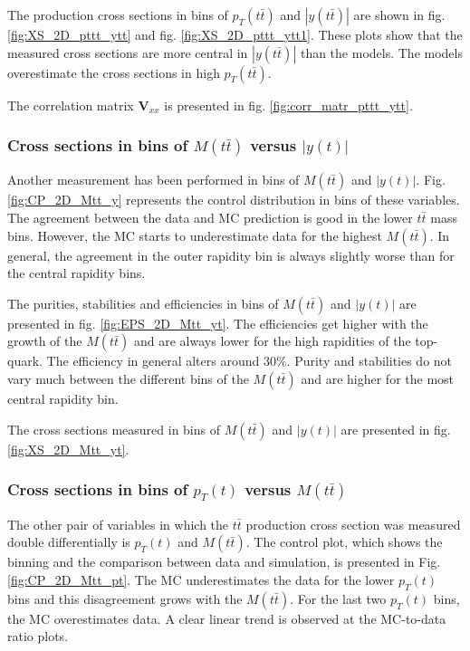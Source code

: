 The production cross sections in bins of $p_{T}(t\bar{t})$ and $|y(t\bar{t})|$ are shown in fig. \ref{fig:XS_2D_pttt_ytt} and fig. \ref{fig:XS_2D_pttt_ytt1}.
These plots show that the measured cross sections are more central in $|y(t\bar{t})|$ than the models. The models overestimate the cross
sections in high $p_{T}(t\bar{t})$.

The correlation matrix $\mathbf{V}_{xx}$ is presented in fig. \ref{fig:corr_matr_pttt_ytt}.


\subsubsection{Cross sections in bins of $M(t\bar{t})$ versus $|y(t)|$}

Another measurement has been performed in bins of $M(t\bar{t})$ and $|y(t)|$. Fig. \ref{fig:CP_2D_Mtt_y} represents the control distribution in bins of these variables.
The agreement between the data and MC prediction is good in the lower $t\bar{t}$ mass bins. However, the MC starts to underestimate data for the highest $M(t\bar{t})$.
In general, the agreement in the outer rapidity bin is always slightly worse than for the central rapidity bins.

The purities, stabilities and efficiencies in bins of $M(t\bar{t})$ and $|y(t)|$ are presented in fig. \ref{fig:EPS_2D_Mtt_yt}. The efficiencies get higher with the 
growth of the $M(t\bar{t})$ and are always lower for the high rapidities of the top-quark. The efficiency in general alters around 30\%. Purity and stabilities
do not vary much between the different bins of the $M(t\bar{t})$ and are higher for the most central rapidity bin. 

The cross sections measured in bins of $M(t\bar{t})$ and $|y(t)|$ are presented in fig. \ref{fig:XS_2D_Mtt_yt}.


\subsubsection{Cross sections in bins of $p_{T}(t)$ versus $M(t\bar{t})$}

The other pair of variables in which the $t\bar{t}$ production cross section was measured double differentially is $p_{T}(t)$ and $M(t\bar{t})$.
The control plot, which shows the binning and the comparison between data and simulation, is presented in Fig. \ref{fig:CP_2D_Mtt_pt}. The MC underestimates 
the data for the lower $p_{T}(t)$ bins and this disagreement grows with the $M(t\bar{t})$. For the last two $p_{T}(t)$ bins, the MC overestimates data. A clear
linear trend is observed at the MC-to-data ratio plots.

